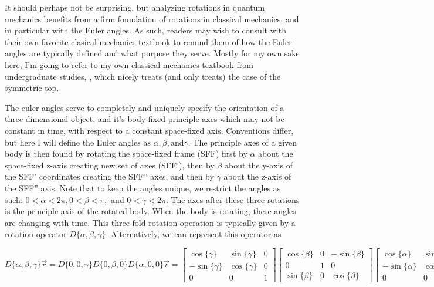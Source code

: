 \documentclass[prl, longbibliography]{revtex4-2}
\begin{document}
It should perhaps not be surprising, but analyzing rotations in quantum mechanics benefits from a firm foundation of rotations in classical mechanics, and in particular with the Euler angles.
As such, readers may wish to consult with their own favorite clasical mechanics textbook to remind them of how the Euler angles are typically defined and what purpose they serve. 
Mostly for my own sake here, I'm going to refer to my own classical mechanics textbook from undergraduate studies, \cite{taylor_classical_2005}, which nicely treats (and only treats) the case of the symmetric top.

The euler angles serve to completely and uniquely specify the orientation of a three-dimensional object, and it's body-fixed principle axes which may not be constant in time, with respect to a constant space-fixed axis. Conventions differ, but here I will define the Euler angles as $\alpha, \beta, \text{and} \gamma$. The principle axes of a given body is then found by rotating the space-fixed frame (SFF) first by $\alpha$ about the space-fixed z-axis creating new set of axes (SFF'), then by $\beta$ about the y-axis of the SFF' coordinates creating the SFF'' axes, and then by $\gamma$ about the z-axis of the SFF'' axis. Note that to keep the angles unique, we restrict the angles as such: $0<\alpha<2\pi, 0<\beta<\pi,$ and $0<\gamma<2\pi$. The axes after these three rotations is the principle axis of the rotated body. When the body is rotating, these angles are changing with time. This three-fold rotation operation is typically given by a rotation operator $D\{\alpha,\beta,\gamma\}$. Alternatively, we can represent this operator as

$$
D\{\alpha,\beta,\gamma\}\vec{r}=D\{0,0,\gamma\}D\{0,\beta,0\}D\{\alpha,0,0\}\vec{r}=
\begin{bmatrix}
\cos\{\gamma\} & \sin\{\gamma\} & 0 \\
-\sin\{\gamma\} & \cos\{\gamma\} & 0 \\
0 & 0 & 1
\end{bmatrix}
\begin{bmatrix}
\cos\{\beta\} & 0 & -\sin\{\beta\} \\
0 & 1 & 0 \\
\sin\{\beta\} & 0 & \cos\{\beta\}
\end{bmatrix}
\begin{bmatrix}
\cos\{\alpha\} & \sin\{\alpha\} & 0 \\
-\sin\{\alpha\} & \cos\{\alpha\} & 0 \\
0 & 0 & 1
\end{bmatrix}
\begin{bmatrix}
x\\
y\\
z
\end{bmatrix}
$$
\end{document}
